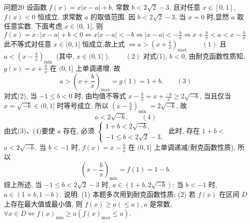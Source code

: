 问题20 设函数 $f(x)=x|x-a|+b$, 常数 $b<2 \sqrt{2}-3$, 且对任意 $x \in[0,1]$, $f(x)<0$ 恒成立.
求常数 $a$ 的取值范围.
因 $b<2 \sqrt{2}-3$, 当 $x=0$ 时,显然 $a$ 取任意实数.
下面考虑 $x \in(0$, $1]$, 则 $f(x)=x \cdot|x-a|+b<0 \Leftrightarrow x|x-a|<-b \Leftrightarrow|x-a|<-\frac{b}{x} \Leftrightarrow x+\frac{b}{x}<a<x-\frac{b}{x}$
此不等式对任意 $x \in(0,1]$ 恒成立,故上式 $\Leftrightarrow a>\left(x+\frac{b}{x}\right)_{\text {max }} \quad\quad(1)$
且 $a<\left(x-\frac{b}{x}\right)_{\text {min }}$ (其中, $x \in(0,1]$ ). $\quad\quad(2)$
对式(1), $b<0$, 由耐克函数性质知, $g(x)=x+\frac{b}{x}$ 在 $(0,1]$ 上单调递增, 故
$$
a>\left(x+\frac{b}{x}\right)_{\max }=g(1)=1+b .  \quad\quad(3)
$$
对式(2), 当 $-1 \leqslant b<0$ 时, 由均值不等式 $x-\frac{b}{x}=x+\frac{-b}{x} \geqslant 2 \sqrt{-b}$, 当且仅当 $x=\sqrt{-b} \in(0,1]$ 时等号成立, 所以 $\left(x-\frac{b}{x}\right)_{\text {min }}=2 \sqrt{-b}$, 故
$$
a<2 \sqrt{-b} .  \quad\quad(4)
$$
由式(3)、(4)要使 $a$ 存在, 必须 $\left\{\begin{array}{l}1+b<2 \sqrt{-b}, \\ -1 \leqslant b<2 \sqrt{2}-3,\end{array}\right.$ 此时, 存在 $1+b<$ $a<2 \sqrt{-b}$.
当 $b<-1$ 时, $f(x)=x-\frac{b}{x}$ 在 $(0,1]$ 上单调递减(耐克函数性质), 所以
$$
\left(x-\frac{b}{x}\right)_{\min }=f(1)=1-b .
$$
综上所述, 当 $-1 \leqslant b<2 \sqrt{2}-3$ 时, $a \in(1+b, 2 \sqrt{-b})$; 当 $b<-1$ 时, $a \in(1+b, 1-b)$.
说明: (1) 本题多次用到耐克函数性质;
(2) 若 $f(x)$ 在区间 $D$ 上存在最大值或最小值, 则 $f(x) \geqslant a(\leqslant a), a$ 是常数, $\forall x \in D \Leftrightarrow f(x)_{\min } \geqslant a\left(f(x)_{\max } \leqslant a\right)$.


